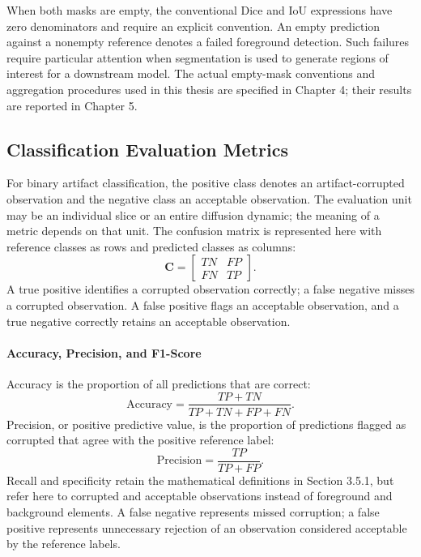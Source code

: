 When both masks are empty, the conventional Dice and IoU expressions have zero denominators and require an explicit convention. An empty prediction against a nonempty reference denotes a failed foreground detection. Such failures require particular attention when segmentation is used to generate regions of interest for a downstream model. The actual empty-mask conventions and aggregation procedures used in this thesis are specified in Chapter 4; their results are reported in Chapter 5.

\subsection{Classification Evaluation Metrics}

For binary artifact classification, the positive class denotes an artifact-corrupted observation and the negative class an acceptable observation. The evaluation unit may be an individual slice or an entire diffusion dynamic; the meaning of a metric depends on that unit. The confusion matrix is represented here with reference classes as rows and predicted classes as columns:
\begin{equation}
\mathbf{C}=
\begin{bmatrix}
TN & FP\\
FN & TP
\end{bmatrix}.
\end{equation}
A true positive identifies a corrupted observation correctly; a false negative misses a corrupted observation. A false positive flags an acceptable observation, and a true negative correctly retains an acceptable observation.

\paragraph{Accuracy, Precision, and F1-Score}
Accuracy is the proportion of all predictions that are correct:
\begin{equation}
\mathrm{Accuracy}=\frac{TP+TN}{TP+TN+FP+FN}.
\end{equation}
Precision, or positive predictive value, is the proportion of predictions flagged as corrupted that agree with the positive reference label:
\begin{equation}
\mathrm{Precision}=\frac{TP}{TP+FP}.
\end{equation}
Recall and specificity retain the mathematical definitions in Section 3.5.1, but refer here to corrupted and acceptable observations instead of foreground and background elements. A false negative represents missed corruption; a false positive represents unnecessary rejection of an observation considered acceptable by the reference labels.

